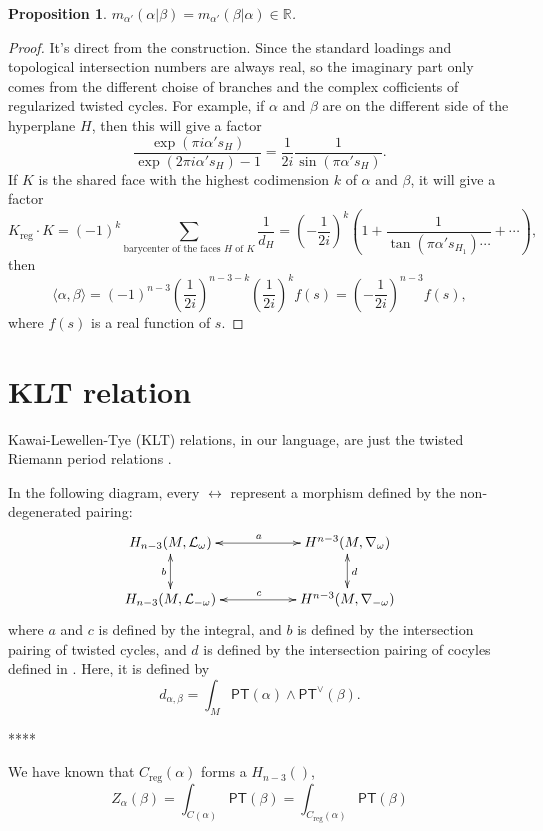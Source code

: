 \documentclass[11pt]{article}
\theoremstyle{definition}
\theoremstyle{plain}
\newtheorem{pro}[para]{Proposition}
\begin{document}
\begin{pro}
$m_{\alpha'}(\alpha|\beta)=m_{\alpha'}(\beta|\alpha)\in \mathbb R$.
\end{pro}

\begin{proof}
It's direct from the construction. Since the standard loadings 
and topological intersection numbers are always real, 
so the imaginary part only comes from the different
choise of branches and the complex cofficients of regularized
twisted cycles. For example, if $\alpha$ and $\beta$ are
on the different side of the hyperplane $H$, then this will give
a factor 
\[
	\frac{\exp(\pi i\alpha' s_H)}{\exp(2\pi i \alpha' s_H)-1}
	=\frac{1}{2i}\frac{1}{\sin(\pi \alpha' s_H)}.
\]
If $K$ is the shared face with the highest codimension $k$
of $\alpha$ and $\beta$, it will give a factor
\[
	K_{\text{reg}}\cdot K = (-1)^{k}
	\sum_{\text{barycenter of the faces $H$ of $K$}}
	\frac{1}{d_H}=\left(-\frac{1}{2i}\right)^k \left(
	1+\frac{1}{\tan(\pi \alpha' s_{H_1})\cdots}+\cdots\right),
\]
then
\[
	\langle \alpha,\beta\rangle=(-1)^{n-3}\left(\frac{1}{2i}\right)^{n-3-k}\left(\frac{1}{2i}\right)^k f(s)=\left(-\frac{1}{2i}\right)^{n-3}f(s),
\]
where $f(s)$ is a real function of $s$.
\end{proof}

\section{KLT relation}

Kawai-Lewellen-Tye (KLT) relations, in our language, are just the 
twisted Riemann period relations \cite{cho1995intersection}.

In the following diagram, every $\leftrightarrow$ represent a morphism
defined by the non-degenerated pairing:
\[
\begin{xy}
\xymatrix{
	H_{n-3}(M,\mathcal L_{\omega})\ar@{<->}[rr]^a\ar@{<->}[d]_b&& H^{n-3}(M,\nabla_{\omega})
	\ar@{<->}[d]^d\\
	H_{n-3}(M,\mathcal L_{-\omega})\ar@{<->}[rr]^c&& H^{n-3}(M,\nabla_{-\omega})
}
\end{xy}
\]
where $a$ and $c$ is defined by the integral, 
and $b$ is defined by the intersection pairing of twisted cycles, 
and $d$ is defined by the intersection pairing of cocyles defined
in \cite{cho1995intersection}. Here, it is defined by
\[
	d_{\alpha,\beta}=\int_M \mathsf{PT}(\alpha)\wedge \mathsf{PT}^\vee(\beta).
\]

****

We have known that $C_{\text{reg}}(\alpha)$ forms a  $H_{n-3}()$, 
\[
	Z_{\alpha}(\beta)=\int_{C(\alpha)}\mathsf{PT}(\beta)=
	\int_{C_{\text{reg}}(\alpha)}\mathsf{PT}(\beta)
\]
\end{document}
